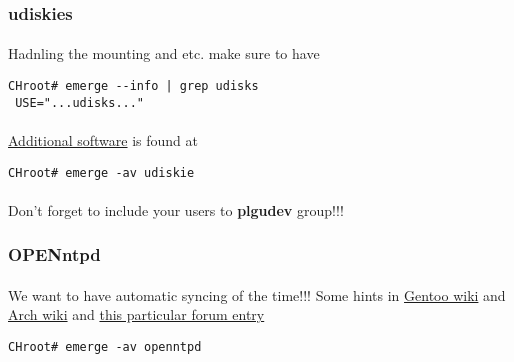 \documentclass[11pt,a4paper]{article}
\begin{document}
                \newpage
                \subsubsection{udiskies}

                    \paragraph{} Hadnling the mounting and etc. make sure to have

                    \begin{lstlisting}[style=BashInputCHRoot]
 CHroot# emerge --info | grep udisks
 USE="...udisks..."
                    \end{lstlisting}

                    \paragraph{} \href{https://wiki.gentoo.org/wiki/Udisks#Emerge}{Additional software} is found at

                    \begin{lstlisting}[style=BashInputCHRoot]
 CHroot# emerge -av udiskie
                    \end{lstlisting}

                    \paragraph{} Don't forget to include your users to \textbf{plgudev} group!!!
                
                \newpage
                \subsubsection{OPENntpd}
                    
                    \paragraph{} We want to have automatic syncing of the time!!! Some hints in \href{https://wiki.gentoo.org/wiki/OpenNTPD}{Gentoo wiki} and \href{https://wiki.archlinux.org/index.php/OpenNTPD}{Arch wiki} and \href{https://forums.gentoo.org/viewtopic-p-8003072.html?sid=9f71ccb3c1b6c9b2afb28070af45549c}{this particular forum entry}
                    
                    \begin{lstlisting}[style=BashInputCHRoot]
 CHroot# emerge -av openntpd
                    \end{lstlisting}
                    
\end{document}
